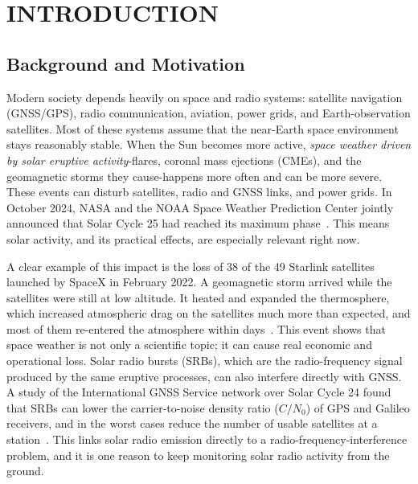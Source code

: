 \chapter{INTRODUCTION}
\label{ch:intro}

\section{Background and Motivation}
\label{sec:motivation}
Modern society depends heavily on space and radio systems: satellite navigation
(GNSS/GPS), radio communication, aviation, power grids, and Earth-observation
satellites. Most of these systems assume that the near-Earth space environment
stays reasonably stable. When the Sun becomes more active, \emph{space weather
driven by solar eruptive activity}-flares, coronal mass ejections (CMEs), and
the geomagnetic storms they cause-happens more often and can be more severe.
These events can disturb satellites, radio and GNSS links, and power grids. In
October 2024, NASA and the NOAA Space Weather Prediction Center jointly
announced that Solar Cycle 25 had reached its maximum
phase~\citep{nasa_noaa_solarmax2024}. This means solar activity, and its
practical effects, are especially relevant right now.

A clear example of this impact is the loss of 38 of the 49 Starlink satellites
launched by SpaceX in February 2022. A geomagnetic storm arrived while the
satellites were still at low altitude. It heated and expanded the thermosphere,
which increased atmospheric drag on the satellites much more than expected, and
most of them re-entered the atmosphere within days~\citep{berger2023starlink}.
This event shows that space weather is not only a scientific topic; it can
cause real economic and operational loss. Solar radio bursts (SRBs), which are
the radio-frequency signal produced by the same eruptive processes, can also
interfere directly with GNSS. A study of the International GNSS Service network
over Solar Cycle 24 found that SRBs can lower the carrier-to-noise density
ratio ($C/N_0$) of GPS and Galileo receivers, and in the worst cases reduce the
number of usable satellites at a station~\citep{floressoriano2024gnss}. This
links solar radio emission directly to a radio-frequency-interference problem,
and it is one reason to keep monitoring solar radio activity from the ground.

